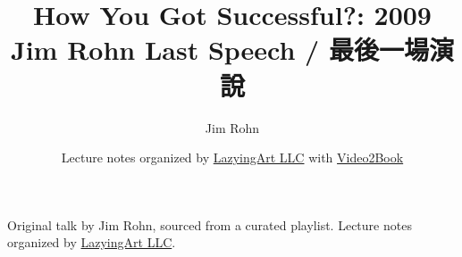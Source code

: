 \documentclass[11pt,oneside]{book}
\begin{document}
\frontmatter
\title{How You Got Successful?: 2009 Jim Rohn Last Speech / 最後一場演說}
\author{Jim Rohn}
\date{Lecture notes organized by \href{https://lazying.art}{LazyingArt LLC} with \href{https://github.com/lachlanchen/Video2Book}{Video2Book}}
\maketitle
\begin{center}
\small Original talk by Jim Rohn, sourced from a curated playlist. Lecture notes organized by \href{https://lazying.art}{LazyingArt LLC}.
\end{center}
\clearpage
\mainmatter

\end{document}
